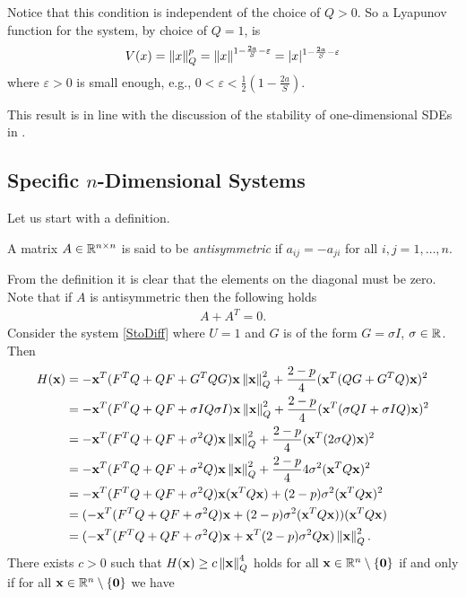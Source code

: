 \documentclass[a4paper,12pt,twoside,BCOR=10mm]{scrbook}
\begin{document}
Notice that this condition is independent of the choice of $Q > 0$. So a Lyapunov function for the system, by choice of $Q = 1$, is
\begin{align*}
    V(x) = \left\lVert x\right\rVert_Q^p = \left\lVert x\right\rVert^{1 - \frac{2a}{S} - \varepsilon} = | x |^{1 - \frac{2a}{S} - \varepsilon}
\end{align*}
where $\varepsilon > 0$ is small enough, e.g., $0 < \varepsilon < \frac{1}{2}\left(1 - \frac{2a}{S}\right)$.

This result is in line with the discussion of the stability of one-dimensional SDEs in \citep[p.~154]{sdestab2012khaminskii}.

\subsection{Specific $n$-Dimensional Systems}
Let us start with a definition.
\begin{definition}
A matrix $A\in \mathbb{R}^{n\times n}$ is said to be \textit{antisymmetric} if $a_{ij} = -a_{ji}$ for all $i,j = 1, \ldots, n$.
\end{definition}
From the definition it is clear that the elements on the diagonal must be zero. Note that if $A$ is antisymmetric then the following holds
\begin{align*}
    A + A^T = 0.
\end{align*}
Consider the system \eqref{StoDiff} where $U = 1$ and $G$ is of the form $G = \sigma I$, $\sigma \in \mathbb{R}^{}$. Then
\begin{align*}
    H(\mathbf{x}) &= -\mathbf{x}^T(F^TQ + QF + G^TQG)\mathbf{x}\left\lVert\mathbf{x} \right\rVert_{Q}^{2} + \frac{2 - p}{4}(\mathbf{x}^T(QG + G^TQ)\mathbf{x})^2\\
    &= -\mathbf{x}^T(F^TQ + QF + \sigma I Q \sigma I)\mathbf{x}\left\lVert\mathbf{x} \right\rVert_{Q}^{2} + \frac{2 - p}{4}(\mathbf{x}^T(\sigma QI + \sigma IQ)\mathbf{x})^2\\
    &= -\mathbf{x}^T(F^TQ + QF + \sigma^2 Q)\mathbf{x}\left\lVert\mathbf{x} \right\rVert_{Q}^{2} + \frac{2-p}{4}(\mathbf{x}^T(2\sigma Q)\mathbf{x})^2\\
    &= -\mathbf{x}^T(F^TQ + QF + \sigma^2 Q)\mathbf{x}\left\lVert\mathbf{x} \right\rVert_{Q}^{2} + \frac{2 - p}{4}4\sigma^2(\mathbf{x}^TQ\mathbf{x})^2\\
    &= -\mathbf{x}^T(F^TQ + QF + \sigma^2 Q)\mathbf{x}(\mathbf{x}^TQ\mathbf{x}) + (2-p)\sigma^2(\mathbf{x}^TQ\mathbf{x})^2\\
    &= (-\mathbf{x}^T(F^TQ + QF + \sigma^2 Q)\mathbf{x} + (2-p)\sigma^2(\mathbf{x}^T Q\mathbf{x}))(\mathbf{x}^T Q\mathbf{x})\\
    &= (-\mathbf{x}^T(F^TQ + QF + \sigma^2 Q)\mathbf{x} + \mathbf{x}^T (2-p)\sigma^2Q\mathbf{x})\left\lVert\mathbf{x}\right\rVert_{Q}^{2}.
\end{align*}
There exists $c > 0$ such that $H(\mathbf{x}) \geq c\left\lVert\mathbf{x}\right\rVert_{Q}^{4}$ holds for all $\mathbf{x} \in \mathbb{R}^{n}\setminus \{\mathbf{0}\}$ if and only if for all $\mathbf{x} \in \mathbb{R}^{n}\setminus \{\mathbf{0}\}$ we have
\end{document}
